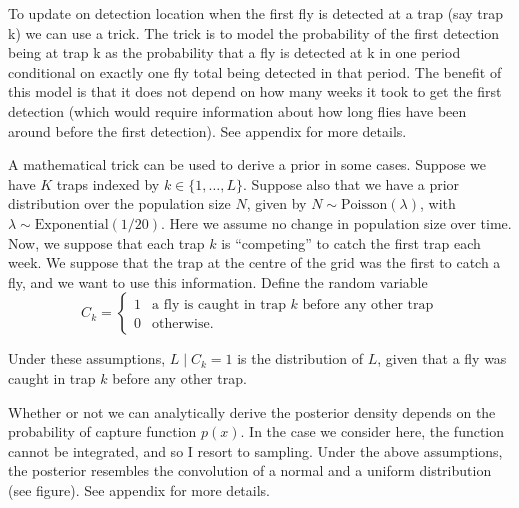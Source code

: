 \documentclass[
]{book}
\begin{document}
To update on detection location when the first fly is detected at a trap (say trap k) we can use a trick. The trick is to model the probability of the first detection being at trap k as the probability that a fly is detected at k in one period conditional on exactly one fly total being detected in that period. The benefit of this model is that it does not depend on how many weeks it took to get the first detection (which would require information about how long flies have been around before the first detection). See appendix for more details.

A mathematical trick can be used to derive a prior in some cases. Suppose we have \(K\) traps indexed by \(k \in \{1, \ldots, L\}\). Suppose also that we have a prior distribution over the population size \(N\), given by \(N \sim \mathrm{Poisson} (\lambda)\), with \(\lambda \sim \mathrm{Exponential(1/20)}\). Here we assume no change in population size over time. Now, we suppose that each trap \(k\) is ``competing'' to catch the first trap each week. We suppose that the trap at the centre of the grid was the first to catch a fly, and we want to use this information. Define the random variable
\[
C_k = \begin{cases}1 & \text{a fly is caught in trap } k \text{ before any other trap} \\ 0 & \text{otherwise}. \end{cases}
\]

Under these assumptions, \(L \mid C_k = 1\) is the distribution of \(L\), given that a fly was caught in trap \(k\) before any other trap.

Whether or not we can analytically derive the posterior density depends on the probability of capture function \(p(x)\). In the case we consider here, the function cannot be integrated, and so I resort to sampling. Under the above assumptions, the posterior resembles the convolution of a normal and a uniform distribution (see figure). See appendix for more details.

  
\end{document}
